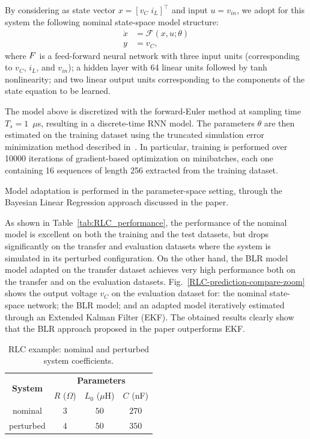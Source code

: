 \documentclass{article}
\newcommand{\F}{\mathcal{F}}
\begin{document}
By considering as state vector $x = [v_C\; i_L]^\top$ and input $u=v_{in}$, we adopt for this system the following nominal state-space model structure:
\begin{align*}
\dot x & = \mathcal{F}(x, u; \theta) \\
 y &= v_{C},
\end{align*}
where $\mathcal \F$ is a feed-forward neural network with three input units (corresponding to $v_C$, $i_L$, and $v_{in}$); a hidden layer with 64 linear units followed by tanh nonlinearity; and two linear output units corresponding to the components of the state equation to be learned. 

The model above is discretized with the forward-Euler method at sampling time $T_s = 1$~$\mu$s, resulting in a 
discrete-time RNN model. The parameters $\theta$ are then estimated on the training dataset using the  {truncated simulation error minimization} method described in~\cite{forgione2021continuous}. 
In particular, training is performed over 10000 iterations of gradient-based optimization on minibatches, each one containing
16 sequences of length 256 extracted from the training dataset. 

Model adaptation is performed in the parameter-space setting, through  the Bayesian Linear Regression approach discussed in the paper. 

As shown in Table~\ref{tab:RLC_performance}, the performance of the nominal model is excellent on both
the training and the test datasets,  but drops significantly on the transfer and evaluation datasets where the system is simulated in its perturbed configuration. On the other hand, the BLR model model adapted on the transfer dataset achieves very high performance both on the transfer and on the evaluation datasets. Fig.~\ref{RLC-prediction-compare-zoom} shows the  output voltage $v_C$ on the evaluation dataset for: the nominal state-space network; the BLR model; and an adapted model iteratively estimated through an Extended Kalman Filter (EKF). The obtained results clearly show that the BLR approach proposed in the paper outperforms EKF. 
 

\begin{table}%
\centering
\begin{tabular}{c | c  c  c}
\multirow{2}{*}{\textbf{System}} & \multicolumn{3}{c}{\textbf{Parameters}} \\
                & $R$ ($\Omega$)     & $L_0$ ($\mu$H)     & $C$ (nF)     \\ %
\hline
nominal         & $3$  & $50$  & $270$  \\
perturbed       & $4$   & $50$ & $350$ \\
\hline
\end{tabular}
\caption{RLC example: nominal and perturbed system coefficients.}
\label{tab:RLC_coefficients}
\end{table}
\end{document}
